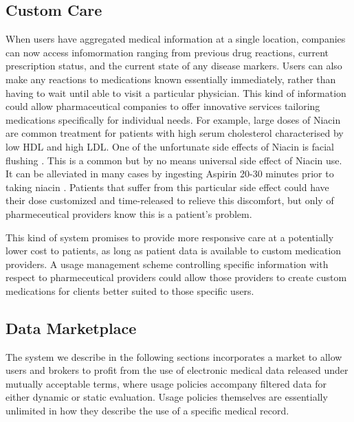 \documentclass[10pt, conference, compsocconf]{IEEEtran}
\begin{document}
\subsection{Custom Care}
When users have aggregated medical information at a single location, companies can now access infomormation ranging from previous drug reactions, current prescription status, and the current state of any disease markers.  Users can also make any reactions to medications known essentially immediately, rather than having to wait until able to visit a particular physician.  This kind of information could allow pharmaceutical companies to offer innovative services tailoring medications specifically for individual needs.  For example, large doses of Niacin are common treatment for patients with high serum cholesterol characterised by low HDL and high LDL.  One of the unfortunate side effects of Niacin is facial flushing \cite{Emr:Web:Niacin}.  This is a common but by no means universal side effect of Niacin use.  It can be alleviated in many cases by ingesting Aspirin 20-30 minutes prior to taking niacin \cite{Emr:Web:Niacin}.  Patients that suffer from this particular side effect could have their dose customized and time-released to relieve this discomfort, but only of pharmeceutical providers know this is a patient's problem.

This kind of system promises to provide more responsive care at a potentially lower cost to patients, as long as patient data is available to custom medication providers.  A usage management scheme controlling specific information with respect to pharmeceutical providers could allow those providers to create custom medications for clients  better suited to those specific users.

\subsection{Data Marketplace}
The system we describe in the following sections incorporates a market to allow users and brokers to profit from the use of electronic medical data released under mutually acceptable terms, where usage policies accompany filtered data for either dynamic or static evaluation.  Usage policies themselves are essentially unlimited in how they describe the use of a specific medical record.
\end{document}
